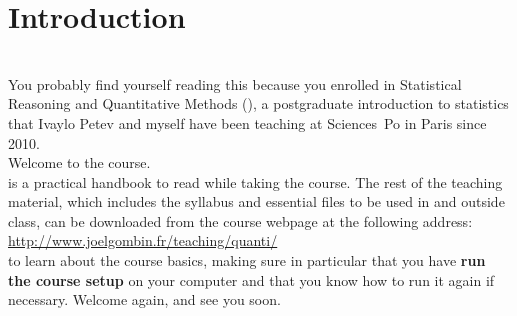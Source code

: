 %
%
\chapter{Introduction}%
	\label{ch:intro}
  \begin{mybox}%
    \\[1em]%
  	You probably find yourself reading this because you enrolled in Statistical Reasoning and Quantitative Methods (\SRQM), a postgraduate introduction to statistics that Ivaylo Petev and myself have been teaching at Sciences~Po in Paris since 2010.\\[1em]%
    Welcome to the course.\\[1em]%
     is a practical handbook to read while taking the course. The rest of the teaching material, which includes the syllabus and essential files to be used in and outside class, can be downloaded from the course webpage at the following address:\\[1em]%
      \url{http://www.joelgombin.fr/teaching/quanti/}\\[1em]%
     to learn about the course basics, making sure in particular that you have \textbf{run the course setup} on your computer and that you know how to run it again if necessary. Welcome again, and see you soon.%
  \end{mybox}\\[4em]%
  \startcontents[chapters]%
	\newpage%

%
%
%
%
%
%
%
%
%
%

\stopcontents[chapters]

%
%
